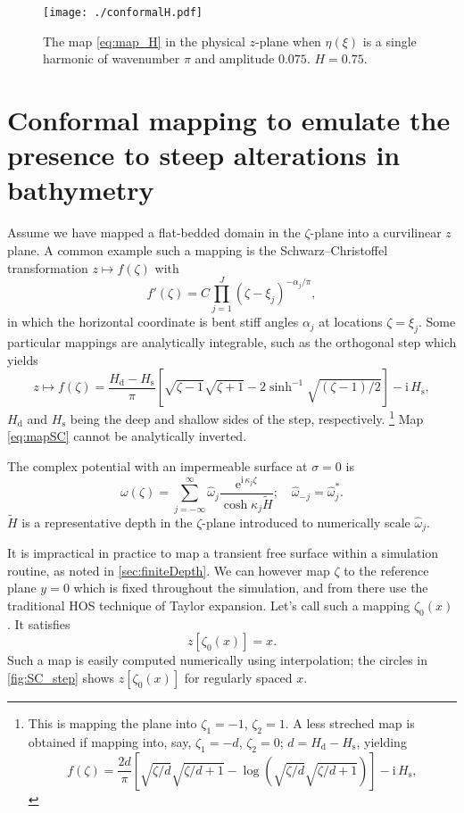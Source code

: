\documentclass[a4paper,12pt]{article}
\newcommand{\mr}{\mathrm}
\newcommand{\ii}{\mr{i}\,}
\newcommand{\ee}{\mr{e}}
\renewcommand{\_}[1]{_\mr{#1}}
\newcommand{\h}{\hat}
\newcommand{\z}{z}
\newcommand{\x}{x}
\newcommand{\y}{y}
\newcommand{\zz}{\zeta}
\newcommand{\xx}{\xi}
\newcommand{\yy}{\sigma}
\newcommand{\kk}{\kappa}
\newcommand{\zmap}{f}
\newcommand{\ww}{\omega}
\begin{document}
\begin{figure}[h!ptb]%
\centering
\texttt{[image: ./conformalH.pdf]}%
\caption{The map \eqref{eq:map_H} in the physical $\z$-plane when $\eta(\xx)$ is a single harmonic of wavenumber $\pi$ and amplitude $0.075$. $H=0.75$.}%
\label{fig:map_H}%
\end{figure}




\section{Conformal mapping to emulate the presence to steep alterations in bathymetry}
\label{sec:CS}
Assume we have mapped a flat-bedded domain in the $\zz$-plane into a curvilinear $\z$ plane. 
A common example such a mapping is the Schwarz--Christoffel  transformation $\z\mapsto \zmap(\zz)$ with
\[
\zmap'(\zz) = C \prod_{j=1}^J (\zz-\xx_j)^{-\alpha_j/\pi},
\]
in which the horizontal coordinate is bent stiff angles $\alpha_j$ at locations $\zeta=\xi_j$.
Some particular mappings are analytically integrable, such as the orthogonal step which yields
\begin{equation}
\z\mapsto\zmap(\zz) = \frac {H\_d-H\_s}\pi \left[  \sqrt{\zz-1}\sqrt{\zz+1} - 2\sinh^{-1}\! \sqrt{(\zz-1)/2} \right] - \ii H\_s,
\label{eq:mapSC}
\end{equation}
$H\_d$ and $H\_s$ being the deep and shallow sides of the step, respectively.%
\footnote{This is mapping the plane into $\zz_1=-1$, $\zz_2=1$. A less streched map is obtained if mapping into, say, $\zz_1=-d$, $\zz_2=0$; $d=H\_d-H\_s$, yielding
\[
\zmap(\zz) =   \frac {2d}\pi \left[  \sqrt{\zz/d}\sqrt{\zz/d+1} - \log\left(\sqrt{\zz/d} \sqrt{\zz/d+1}\right) \right] - \ii H\_s,
\]
 }
Map \eqref{eq:mapSC} cannot be analytically inverted.

The complex potential with an impermeable surface at $\yy=0$ is
\begin{equation}
\ww(\zz) = \sum_{j=-\infty}^\infty\h\ww_j \frac{\ee^{\ii \kk_j\zz}}{\cosh \kk_j \tilde H}; \quad \h\ww_{-j}=\h\ww_{j}^*.
\label{eq:ww_logstrip}
\end{equation}
$\tilde H$ is a representative depth in the $\zeta$-plane introduced to numerically scale $\h\ww_j$.

It is impractical in practice to map a transient free surface within a simulation routine, as noted in \autoref{sec:finiteDepth}.
We can however map $\zz$ to the reference plane $\y = 0$ which is fixed throughout the simulation, and from there use the traditional HOS technique of Taylor expansion.
Let's call such a mapping $\zz_0(\x)$. It satisfies
\[
\z[\zz_0(x)]=x.%
\]
Such a map is easily computed numerically using interpolation; the circles in \autoref{fig:SC_step} shows $\z[\zz_0(x)]$ for regularly spaced $x$.
\\
\end{document}
